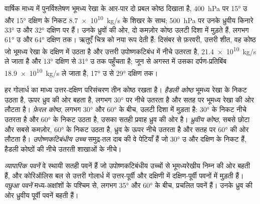 वार्षिक माध्य में पुनर्विश्लेषण भूमध्य रेखा के आर-पार दो प्रबल कोष्ठ दिखाता है, \qty{400}{hPa} पर \ang{15} उ और \ang{15} दक्षिण के निकट \qty{8.7e10}{kg/s} के शिखर के साथ; \qty{500}{hPa} पर उनके ध्रुवीय किनारे \ang{33} उ और \ang{32} दक्षिण पर हैं। उनके ध्रुवों की ओर, दो कमज़ोर कोष्ठ उलटी दिशा में मुड़ते हैं, लगभग \ang{61} उ और \ang{64} दक्षिण तक। ऋतुएँ चित्र को नया रूप देती हैं: दिसंबर से फ़रवरी, उत्तरी शीत, वह कोष्ठ जो भूमध्य रेखा के दक्षिण में उठता है और उत्तरी उपोष्णकटिबंध में नीचे उतरता है, \qty{21.4e10}{kg/s} ले जाता है और \ang{13} दक्षिण से \ang{31} उ तक पहुँचता है; जून से अगस्त में उसका दर्पण-प्रतिबिंब \qty{18.9e10}{kg/s} ले जाता है, \ang{17} उ से \ang{29} दक्षिण तक।

\begin{definition}[हैडली, फ़ेरल और ध्रुवीय कोष्ठ; उपोष्णकटिबंधीय उच्च]\label{def:b1:atmospheric-circulation:cells}
हर गोलार्ध का माध्य उत्तर-दक्षिण परिसंचरण तीन कोष्ठ रखता है। \emph{हैडली कोष्ठ} भूमध्य रेखा के निकट उठता है, ऊपर ध्रुव की ओर बहता है, लगभग \ang{30} पर नीचे उतरता है और सतह पर भूमध्य रेखा की ओर लौटता है। \emph{फ़ेरल कोष्ठ}, लगभग \ang{30} और \ang{60} के बीच, उलटी दिशा में मुड़ता है:
\ang{30} के निकट नीचे उतरता है और \ang{60} के निकट उठता है, उसका सतही प्रवाह ध्रुव की ओर है। \emph{ध्रुवीय कोष्ठ}, सबसे छोटा और सबसे कमज़ोर, \ang{60} के निकट उठता है, ध्रुव के ऊपर नीचे उतरता है और सतह पर \ang{60} की ओर लौटता है। \emph{उपोष्णकटिबंधीय उच्च} समुद्र-तल दाब की वे पेटियाँ हैं जो \ang{30} उ और दक्षिण के निकट हैं, हैडली कोष्ठों की नीचे उतरती शाखाओं के नीचे।
\end{definition}

\begin{definition}\label{def:b1:atmospheric-circulation:winds}
\emph{व्यापारिक पवनें} वे स्थायी सतही पवनें हैं जो उपोष्णकटिबंधीय उच्चों से भूमध्यरेखीय निम्न की ओर बहती हैं, और कोरिऑलिस बल से उत्तरी गोलार्ध में उत्तर-पूर्वी और दक्षिणी में दक्षिण-पूर्वी पवनों में मुड़ती हैं। \emph{पछुआ पवनें} मध्य-अक्षांशों के पश्चिम से, लगभग \ang{35} और \ang{60} के बीच, प्रचलित पवनें हैं। उनके ध्रुव की ओर ध्रुवीय पूर्वी पवनें बहती हैं।
\end{definition}

